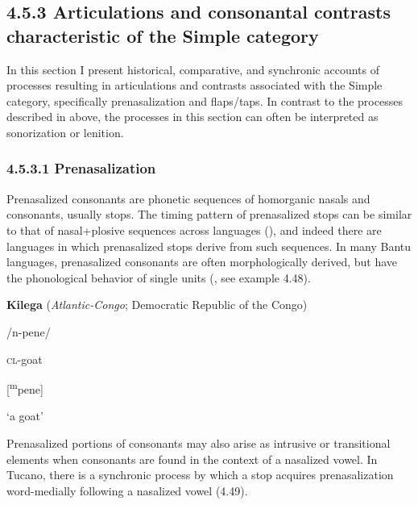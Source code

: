 \subsection{4.5.3 Articulations and consonantal contrasts characteristic of the Simple category}

  In this section I present historical, comparative, and synchronic accounts of processes resulting in articulations and contrasts associated with the Simple category, specifically prenasalization and flaps/taps. In contrast to the processes described in  above, the processes in this section can often be interpreted as sonorization or lenition.


\subsubsection{\textbf{4.5.3.1} \textbf{Prenasalization} }

  Prenasalized consonants are phonetic sequences of homorganic nasals and consonants, usually stops. The timing pattern of prenasalized stops can be similar to that of nasal+plosive sequences across languages (\citealt{BrowmanGoldstein1986}), and indeed there are languages in which prenasalized stops derive from such sequences. In many Bantu languages, prenasalized consonants are often morphologically derived, but have the phonological behavior of single units (\citealt{Tak2011}, see example 4.48).



\ea\label{ex:(4.48)}
  \textbf{Kilega} (\textit{Atlantic-Congo}; Democratic Republic of the Congo)



/n-pene/



\textsc{cl}{}-goat



[\textsuperscript{m}pene]



‘a goat’



\citep[132]{Tak2011}

\z


  Prenasalized portions of consonants may also arise as intrusive or transitional elements when consonants are found in the context of a nasalized vowel. In Tucano, there is a synchronic process by which a stop acquires prenasalization word-medially following a nasalized vowel (4.49).



